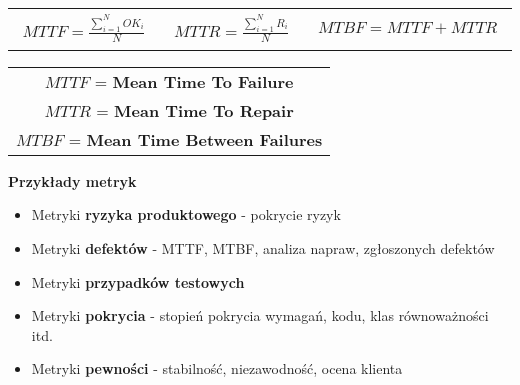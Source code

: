 \documentclass[../main.tex]{subfiles}
\begin{document}
    \begin{table}[H]
        \begin{center}
            \begin{tabular}{p{5cm} p{5cm} p{5cm}}
                \begin{align*}
                    MTTF = \frac{\sum_{i=1}^{N} OK_i}{N}
                \end{align*}
                &
                \begin{align*}
                    MTTR = \frac{\sum_{i=1}^{N} R_i}{N}
                \end{align*}
                &
                \begin{align*}
                    MTBF = MTTF + MTTR
                \end{align*}
            \end{tabular}
        \end{center}
    \end{table}

    \begin{table}[H]
        \begin{center}
            \begin{tabular}{c}

                $MTTF$ = \textbf{Mean Time To Failure}       \\

                $MTTR$ = \textbf{Mean Time To Repair}        \\

                $MTBF$ = \textbf{Mean Time Between Failures} \\

            \end{tabular}
        \end{center}
    \end{table}

    \textbf{Przykłady metryk}
    \begin{itemize}
        \item Metryki \textbf{ryzyka produktowego} - pokrycie ryzyk
        \item Metryki \textbf{defektów} - MTTF, MTBF, analiza napraw, zgłoszonych defektów
        \item Metryki \textbf{przypadków testowych}
        \item Metryki \textbf{pokrycia} - stopień pokrycia wymagań, kodu, klas równoważności itd.
        \item Metryki \textbf{pewności} - stabilność, niezawodność, ocena klienta
    \end{itemize}
\end{document}
